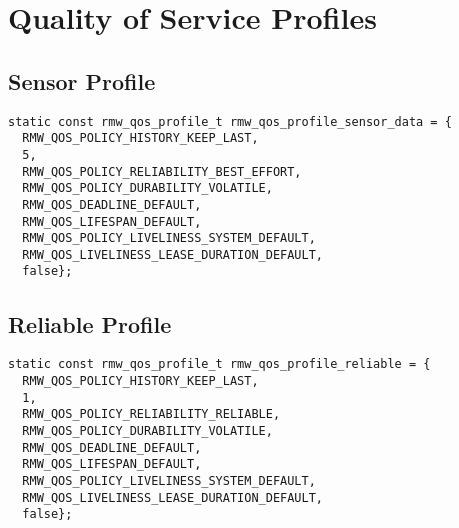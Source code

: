 
\Appendix
\label{ch:Appendix}
\section{Quality of Service Profiles}\label{sec:app-qos}
\subsection*{Sensor Profile}
\lstset{language=C++,basicstyle=\scriptsize}
\begin{lstlisting}[caption=The used sensor profile.,label=ca_code_sensor_profile]
static const rmw_qos_profile_t rmw_qos_profile_sensor_data = {
  RMW_QOS_POLICY_HISTORY_KEEP_LAST,
  5,
  RMW_QOS_POLICY_RELIABILITY_BEST_EFFORT,
  RMW_QOS_POLICY_DURABILITY_VOLATILE,
  RMW_QOS_DEADLINE_DEFAULT,
  RMW_QOS_LIFESPAN_DEFAULT,
  RMW_QOS_POLICY_LIVELINESS_SYSTEM_DEFAULT,
  RMW_QOS_LIVELINESS_LEASE_DURATION_DEFAULT,
  false};
\end{lstlisting}
\subsection*{Reliable Profile}
\begin{lstlisting}[caption=The used reliable profile.,label=ca_code_sensor_profile]
static const rmw_qos_profile_t rmw_qos_profile_reliable = {
  RMW_QOS_POLICY_HISTORY_KEEP_LAST,
  1,
  RMW_QOS_POLICY_RELIABILITY_RELIABLE,
  RMW_QOS_POLICY_DURABILITY_VOLATILE,
  RMW_QOS_DEADLINE_DEFAULT,
  RMW_QOS_LIFESPAN_DEFAULT,
  RMW_QOS_POLICY_LIVELINESS_SYSTEM_DEFAULT,
  RMW_QOS_LIVELINESS_LEASE_DURATION_DEFAULT,
  false};
\end{lstlisting}